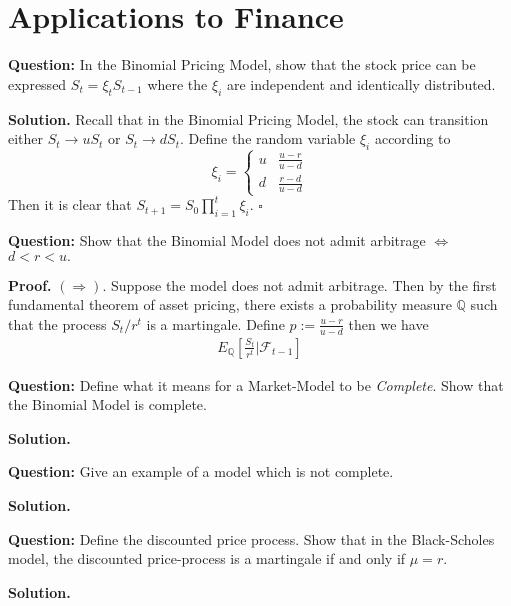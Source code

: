 \documentclass{article}
\begin{document}
\newpage
\section{Applications to Finance}

\begin{tcolorbox}[colframe=black,colback=gray!5,boxrule=0.5pt]
\textbf{Question:} In the Binomial Pricing Model, show that the stock price can be expressed $S_t = \xi_tS_{t-1}$ where the $\xi_i$ are independent and identically distributed.   \cite{Fima}
\end{tcolorbox}
\textbf{Solution.}
Recall that in the Binomial Pricing Model, the stock can transition either $S_{t} \to uS_t$ or $S_t \to dS_t$. Define the random variable $\xi_i$ according to 
\[ \xi_i = \begin{cases} 
      u & \frac{u-r}{u-d} \\
      d & \frac{r-d}{u-d}
   \end{cases}
\]
Then it is clear that $S_{t+1} = S_0\prod_{i=1}^{t}\xi_i$. $\square$

\begin{tcolorbox}[colframe=black,colback=gray!5,boxrule=0.5pt]
\textbf{Question:} Show that the Binomial Model does not admit arbitrage $\iff$ $d<r<u.$
\end{tcolorbox}
\textbf{Proof.}
$(\Rightarrow)$. Suppose the model does not admit arbitrage. Then by the first fundamental theorem of asset pricing, there exists a probability measure $\mathbb{Q}$ such that the process $S_t / r^t$ is a martingale. Define $p:= \frac{u-r}{u-d}$ then we have 
\begin{align*}
    E_\mathbb{Q}\left[\frac{S_t}{r^t} | \mathcal{F}_{t-1}\right]
\end{align*}
 
\begin{tcolorbox}[colframe=black,colback=gray!5,boxrule=0.5pt]
\textbf{Question:} Define what it means for a Market-Model to be \textit{Complete}. Show that the Binomial Model is complete. 
\end{tcolorbox}
\textbf{Solution.}


\begin{tcolorbox}[colframe=black,colback=gray!5,boxrule=0.5pt]
\textbf{Question:} Give an example of a model which is not complete. 
\end{tcolorbox}
\textbf{Solution.}

\begin{tcolorbox}[colframe=black,colback=gray!5,boxrule=0.5pt]
\textbf{Question:} Define the discounted price process. Show that in the Black-Scholes model, the discounted price-process is a martingale if and only if $\mu = r$.
\end{tcolorbox}
\textbf{Solution.}
\end{document}
